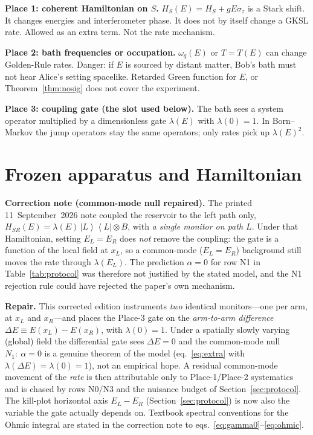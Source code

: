 \documentclass[11pt]{article}
\newenvironment{correction}{%
  \par\medskip
  \begin{lrbox}{\corrsave}%
  \begin{minipage}{\dimexpr\linewidth-2\fboxsep}%
    \small
}{%
  \end{minipage}%
  \end{lrbox}%
  \noindent\fcolorbox{corrrule}{corrback}{\usebox\corrsave}%
  \par\medskip
}
\theoremstyle{definition}
\theoremstyle{plain}
\newcommand{\ket}[1]{\left|{#1}\right\rangle}
\newcommand{\bra}[1]{\left\langle{#1}\right|}
\begin{document}
\textbf{Place 1: coherent Hamiltonian on $S$.} $H_S(E) = H_S + gE\sigma_z$ is a Stark shift. It changes
energies and interferometer phase. It does not by itself change a GKSL rate. Allowed as an extra
term. Not the rate mechanism.

\textbf{Place 2: bath frequencies or occupation.} $\omega_q(E)$ or $T=T(E)$ can change Golden-Rule
rates. Danger: if $E$ is sourced by distant matter, Bob's bath must not hear Alice's setting
spacelike. Retarded Green function for $E$, or Theorem~\ref{thm:nosig} does not cover the experiment.

\textbf{Place 3: coupling gate (the slot used below).} The bath sees a system operator multiplied
by a dimensionless gate $\lambda(E)$ with $\lambda(0)=1$. In Born--Markov the jump operators stay the
same operators; only rates pick up $\lambda(E)^2$.

\section{Frozen apparatus and Hamiltonian}\label{sec:apparatus}

\begin{correction}
\noindent\textbf{Correction note (common-mode null repaired).}
The printed 11~September~2026 note coupled the reservoir to the left path only,
$H_{SR}(E) = \lambda(E)\,\ket{L}\!\bra{L}\otimes B$, with \emph{a single monitor on path $L$}. Under that
Hamiltonian, setting $E_L = E_R$ does \emph{not} remove the coupling: the gate is a function of the local
field at $x_L$, so a common-mode ($E_L = E_R$) background still moves the rate through
$\lambda(E_L)$. The prediction $\alpha = 0$ for row N1 in Table~\ref{tab:protocol} was therefore not
justified by the stated model, and the N1 rejection rule could have rejected the paper's own
mechanism.
\medskip\par\noindent
\textbf{Repair.} This corrected edition instruments \emph{two} identical monitors---one per arm, at
$x_L$ and $x_R$---and places the Place-3 gate on the \emph{arm-to-arm difference}
$\Delta E \equiv E(x_L) - E(x_R)$, with $\lambda(0) = 1$. Under a spatially slowly varying (global) field
the differential gate sees $\Delta E = 0$ and the common-mode null $N_1{:}\ \alpha=0$ is a genuine
theorem of the model (eq.~\eqref{eq:extra} with $\lambda(\Delta E) = \lambda(0) = 1$), not an empirical
hope. A residual common-mode movement of the \emph{rate} is then attributable only to Place-1/Place-2
systematics and is chased by rows N0/N3 and the nuisance budget of Section~\ref{sec:protocol}.
The kill-plot horizontal axis $E_L - E_R$ (Section~\ref{sec:protocol}) is now also the variable the
gate actually depends on. Textbook spectral conventions for the Ohmic integral are stated in the
correction note to eqs.~\eqref{eq:gamma0}--\eqref{eq:ohmic}.
\end{correction}
\end{document}
